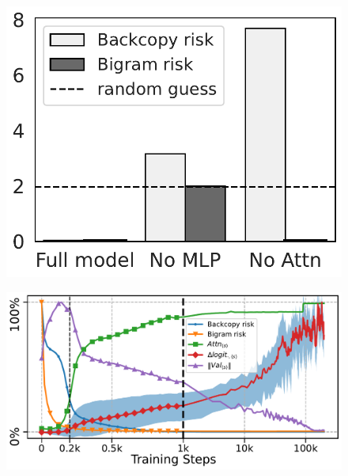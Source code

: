 \begin{figure}
  \centering
  \begin{minipage}{0.37\textwidth}
      \centering
      \label{fig:interventions}
      \includegraphics[width=\textwidth]{Figures/BBM/interventions.pdf}
  \end{minipage}
  \begin{minipage}{0.6\textwidth}
      \centering
      \label{fig:dynamics}
    \includegraphics[width=\textwidth]{Figures/BBM/dynamics_combine.pdf}
  \end{minipage}
  \hspace{-1em}

\end{figure}
